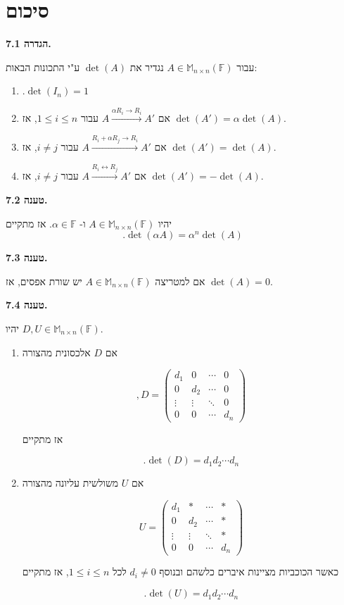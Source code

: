 \documentclass[12pt]{report}
\theoremstyle{plain}
\theoremstyle{definition}
\newcommand{\F}{\mathbb{F}}
\newcommand{\M}{\mathbb{M}}
\newcommand{\0}{\mathbf{0}}
\begin{document}
\clearpage
\section{סיכום}

\noindent\textbf{הגדרה 7.1.}

עבור
$A\in\M_{n\times n}(\F)$
נגדיר את 
$\det(A)$
ע"י התכונות הבאות:

\begin{enumerate}[label=\alph*.]
\item 
$
.\det(I_n)=1
$


\item 
אם
$A\xrightarrow{\alpha R_i\to R_i}A'$
עבור
$1\leq i \leq n$,
אז
$\det(A')=\alpha \det(A)$.

\item 
אם
$A\xrightarrow{R_i+\alpha R_j\to R_i}A'$
עבור
$i\neq j$,
אז
$\det(A')=\det(A)$.


\item 
אם
$A\xrightarrow{R_i\leftrightarrow R_j}A'$
עבור
$i\neq j$,
אז
$\det(A')=-\det(A)$.


\end{enumerate}
\bigskip
\bigskip

\noindent\textbf{טענה 7.2.}

יהיו
$A\in\M_{n\times n}(\F)$
ו-
$\alpha\in\F$.
אז מתקיים
$$
.\det(\alpha A)=\alpha^n\det(A)
$$
\bigskip
\bigskip

\noindent\textbf{טענה 7.3.}

אם למטריצה
$A\in\M_{n\times n}(\F)$
יש שורת אפסים,
אז
$\det(A)=0$.
\bigskip
\bigskip

\noindent\textbf{טענה 7.4.}

יהיו
$D,U\in\M_{n\times n}(\F)$.

\begin{enumerate}[label=\alph*.]
\item 
אם
$D$
אלכסונית מהצורה

$$
,D=\begin{pmatrix}
d_1 &0 & \cdots & 0 \\
0 & d_2 & \cdots & 0 \\
\vdots & \vdots & \ddots & 0 \\
0 & 0 & \cdots & d_n
\end{pmatrix}
$$

אז מתקיים

$$
.\det(D)=d_1d_2\cdots d_n
$$


\item
אם
$U$
משולשית עליונה מהצורה

$$
U=\begin{pmatrix}
d_1 &* & \cdots & * \\
0 & d_2 & \cdots & * \\
\vdots & \vdots & \ddots & * \\
0 & 0 & \cdots & d_n
\end{pmatrix}
$$

כאשר הכוכביות מציינות איברים כלשהם ובנוסף
$d_i\neq 0$
לכל 
$1\leq i\leq n$,
אז מתקיים

$$
.\det(U)=d_1d_2\cdots d_n
$$


\end{enumerate}
\bigskip
\bigskip
\end{document}
